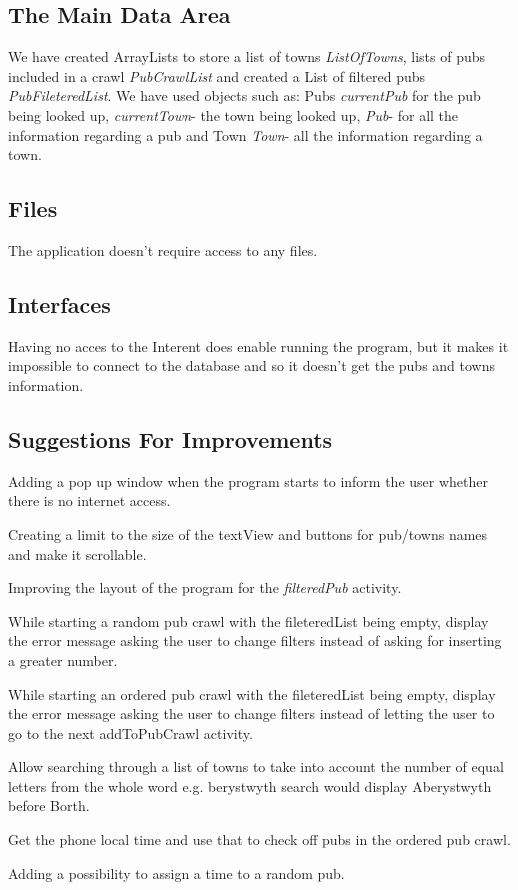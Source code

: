 \documentclass{project}
\begin{document}
\subsection{The Main Data Area}
We have created ArrayLists to store a list of towns \textit{ListOfTowns}, lists of pubs included in a crawl \textit{PubCrawlList} and created a List of filtered pubs \textit{PubFileteredList}. We have used objects such as: Pubs \textit{currentPub} for the pub being looked up, \textit{currentTown}- the town being looked up, \textit{Pub}- for all the information regarding a pub and Town \textit{Town}- all the information regarding a town.\par

\subsection{Files}
The application doesn't require access to any files.

\subsection{Interfaces}
Having no acces to the Interent does enable running the program, but it makes it impossible to connect to the database and so it doesn't get the pubs and towns information.\par

\subsection{Suggestions For Improvements}
Adding a pop up window when the program starts to inform the user whether there is no internet access. \par
Creating a limit to the size of the textView and buttons for pub/towns names and make it scrollable.\par
Improving the layout of the program for the \textit{filteredPub} activity. \par
While starting a random pub crawl with the fileteredList being empty, display the error message asking the user to change filters instead of asking for inserting a greater number.\par
While starting an ordered pub crawl with the fileteredList being empty, display the error message asking the user to change filters instead of letting the user to go to the next addToPubCrawl activity.\par
Allow searching through a list of towns to take into account the number of equal letters from the whole word e.g. berystwyth search would display Aberystwyth before Borth. \par
Get the phone local time and use that to check off pubs in the ordered pub crawl.\par
Adding a possibility to assign a time to a random pub. \par
\end{document}
